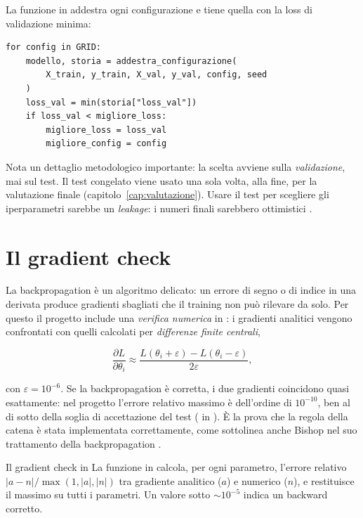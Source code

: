 La funzione  in
 addestra ogni configurazione e tiene quella
con la loss di validazione minima:

\begin{lstlisting}[caption={Selezione della configurazione migliore in \file{train\_model.py} (abbreviato).}]
for config in GRID:
    modello, storia = addestra_configurazione(
        X_train, y_train, X_val, y_val, config, seed
    )
    loss_val = min(storia["loss_val"])
    if loss_val < migliore_loss:
        migliore_loss = loss_val
        migliore_config = config
\end{lstlisting}

Nota un dettaglio metodologico importante: la scelta avviene sulla
\emph{validazione}, mai sul test. Il test congelato viene usato una sola
volta, alla fine, per la valutazione finale
(capitolo~\ref{cap:valutazione}). Usare il test per scegliere gli
iperparametri sarebbe un \emph{leakage}: i numeri finali sarebbero
ottimistici \cite{progetto2026}.

\section{Il gradient check}\label{sec:gradient-check}

La backpropagation è un algoritmo delicato: un errore di segno o di indice
in una derivata produce gradienti sbagliati che il training non può
rilevare da solo. Per questo il progetto include una \emph{verifica
numerica} in : i
gradienti analitici vengono confrontati con quelli calcolati per
\emph{differenze finite centrali},

\begin{equation}
\frac{\partial L}{\partial \theta_i} \approx
\frac{L(\theta_i + \varepsilon) - L(\theta_i - \varepsilon)}{2\varepsilon},
\end{equation}

con $\varepsilon = 10^{-6}$. Se la backpropagation è corretta, i due
gradienti coincidono quasi esattamente: nel progetto l'errore relativo
massimo è dell'ordine di $10^{-10}$, ben al di sotto della soglia di
accettazione del test ( in ). È la
prova che la regola della catena è stata implementata correttamente, come
sottolinea anche Bishop nel suo trattamento della backpropagation
\cite{bishop2006pattern}.

\begin{esempio}{Il gradient check in \progetto{}}
La funzione  in
 calcola, per ogni parametro, l'errore relativo
$\lvert a - n \rvert / \max(1, \lvert a \rvert, \lvert n \rvert)$ tra
gradiente analitico ($a$) e numerico ($n$), e restituisce il massimo su
tutti i parametri. Un valore sotto $\sim 10^{-5}$ indica un backward
corretto.
\end{esempio}